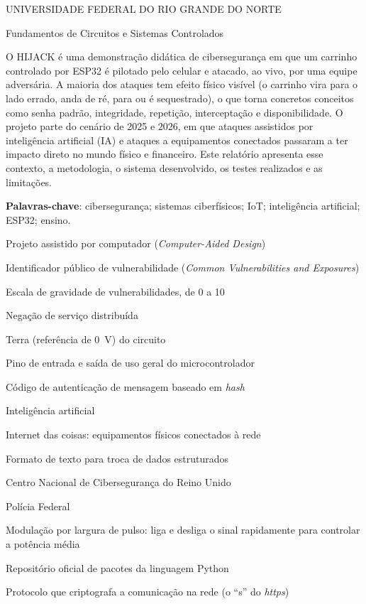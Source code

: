 \documentclass[12pt,openright,oneside,a4paper,english,brazil]{abntex2}
\renewcommand{\imprimircapa}{%
  \begin{capa}%
    \center
    {\ABNTEXchapterfont\large UNIVERSIDADE FEDERAL DO RIO GRANDE DO NORTE}\par
    \vspace*{0.3cm}
    {\large Fundamentos de Circuitos e Sistemas Controlados}\par
    \vspace*{2cm}
    {\ABNTEXchapterfont\large\imprimirautor}
    \vfill
    \begin{center}
      \ABNTEXchapterfont\bfseries\LARGE\imprimirtitulo
    \end{center}
    \vfill
    \large\imprimirlocal\par
    \large\imprimirdata
    \vspace*{1cm}
  \end{capa}
}
\begin{document}
\pretextual

\imprimircapa
\imprimirfolhaderosto

\begin{resumo}
O HIJACK é uma demonstração didática de cibersegurança em que um carrinho controlado por ESP32 é pilotado pelo celular e atacado, ao vivo, por uma equipe adversária. A maioria dos ataques tem efeito físico visível (o carrinho vira para o lado errado, anda de ré, para ou é sequestrado), o que torna concretos conceitos como senha padrão, integridade, repetição, interceptação e disponibilidade. O projeto parte do cenário de 2025 e 2026, em que ataques assistidos por inteligência artificial (IA) e ataques a equipamentos conectados passaram a ter impacto direto no mundo físico e financeiro. Este relatório apresenta esse contexto, a metodologia, o sistema desenvolvido, os testes realizados e as limitações.

\textbf{Palavras-chave}: cibersegurança; sistemas ciberfísicos; IoT; inteligência artificial; ESP32; ensino.
\end{resumo}

\begin{siglas}
  \item[CAD] Projeto assistido por computador (\emph{Computer-Aided Design})
  \item[CVE] Identificador público de vulnerabilidade (\emph{Common Vulnerabilities and Exposures})
  \item[CVSS] Escala de gravidade de vulnerabilidades, de 0 a 10
  \item[DDoS] Negação de serviço distribuída
  \item[GND] Terra (referência de 0~V) do circuito
  \item[GPIO] Pino de entrada e saída de uso geral do microcontrolador
  \item[HMAC] Código de autenticação de mensagem baseado em \emph{hash}
  \item[IA] Inteligência artificial
  \item[IoT] Internet das coisas: equipamentos físicos conectados à rede
  \item[JSON] Formato de texto para troca de dados estruturados
  \item[NCSC] Centro Nacional de Cibersegurança do Reino Unido
  \item[PF] Polícia Federal
  \item[PWM] Modulação por largura de pulso: liga e desliga o sinal rapidamente para controlar a potência média
  \item[PyPI] Repositório oficial de pacotes da linguagem Python
  \item[TLS] Protocolo que criptografa a comunicação na rede (o \enquote{s} do \emph{https})
\end{siglas}
\end{document}
